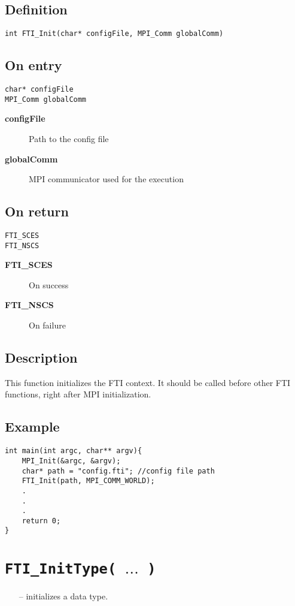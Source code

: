 \documentclass{refrep}
\begin{document}
\subsection*{Definition}
\begin{lstlisting}[frame=single]
int FTI_Init(char* configFile, MPI_Comm globalComm)
\end{lstlisting}
\subsection*{On entry}
\begin{lstlisting}[frame=single]
char* configFile
MPI_Comm globalComm
\end{lstlisting}
\begin{description}
\item[\textbf{configFile}] Path to the config file
\item[\textbf{globalComm}] MPI communicator used for the execution
\end{description}
\subsection*{On return}
\begin{lstlisting}[frame=single]
FTI_SCES
FTI_NSCS
\end{lstlisting}
\begin{description}
\item[\textbf{FTI\_SCES}] On success
\item[\textbf{FTI\_NSCS}] On failure
\end{description}
\subsection*{Description}
This function initializes the FTI context. It should be called before other FTI functions, right after MPI initialization.
\subsection*{Example}
\begin{center}
\begin{lstlisting}[frame=single]
int main(int argc, char** argv){
    MPI_Init(&argc, &argv);
    char* path = "config.fti"; //config file path
    FTI_Init(path, MPI_COMM_WORLD);
    .
    .
    .
    return 0;
}
\end{lstlisting}
\end{center}
\newpage
\section{\tt FTI\_InitType( $\dots$ )}\label{sec:ftiinittype}
\begin{framed}
\begin{itemize}
\item[--] initializes a data type.
\end{itemize}
\end{framed}
\end{document}
